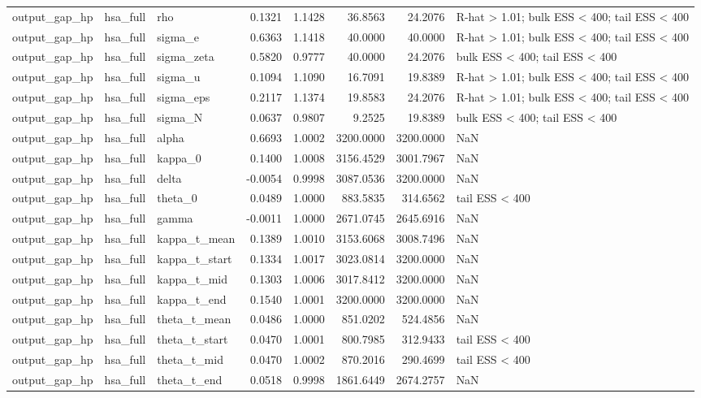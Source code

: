 \begin{tabular}{lllrrrrl}
output\_gap\_hp & hsa\_full & rho & 0.1321 & 1.1428 & 36.8563 & 24.2076 & R-hat > 1.01; bulk ESS < 400; tail ESS < 400 \\
output\_gap\_hp & hsa\_full & sigma\_e & 0.6363 & 1.1418 & 40.0000 & 40.0000 & R-hat > 1.01; bulk ESS < 400; tail ESS < 400 \\
output\_gap\_hp & hsa\_full & sigma\_zeta & 0.5820 & 0.9777 & 40.0000 & 24.2076 & bulk ESS < 400; tail ESS < 400 \\
output\_gap\_hp & hsa\_full & sigma\_u & 0.1094 & 1.1090 & 16.7091 & 19.8389 & R-hat > 1.01; bulk ESS < 400; tail ESS < 400 \\
output\_gap\_hp & hsa\_full & sigma\_eps & 0.2117 & 1.1374 & 19.8583 & 24.2076 & R-hat > 1.01; bulk ESS < 400; tail ESS < 400 \\
output\_gap\_hp & hsa\_full & sigma\_N & 0.0637 & 0.9807 & 9.2525 & 19.8389 & bulk ESS < 400; tail ESS < 400 \\
output\_gap\_hp & hsa\_full & alpha & 0.6693 & 1.0002 & 3200.0000 & 3200.0000 & NaN \\
output\_gap\_hp & hsa\_full & kappa\_0 & 0.1400 & 1.0008 & 3156.4529 & 3001.7967 & NaN \\
output\_gap\_hp & hsa\_full & delta & -0.0054 & 0.9998 & 3087.0536 & 3200.0000 & NaN \\
output\_gap\_hp & hsa\_full & theta\_0 & 0.0489 & 1.0000 & 883.5835 & 314.6562 & tail ESS < 400 \\
output\_gap\_hp & hsa\_full & gamma & -0.0011 & 1.0000 & 2671.0745 & 2645.6916 & NaN \\
output\_gap\_hp & hsa\_full & kappa\_t\_mean & 0.1389 & 1.0010 & 3153.6068 & 3008.7496 & NaN \\
output\_gap\_hp & hsa\_full & kappa\_t\_start & 0.1334 & 1.0017 & 3023.0814 & 3200.0000 & NaN \\
output\_gap\_hp & hsa\_full & kappa\_t\_mid & 0.1303 & 1.0006 & 3017.8412 & 3200.0000 & NaN \\
output\_gap\_hp & hsa\_full & kappa\_t\_end & 0.1540 & 1.0001 & 3200.0000 & 3200.0000 & NaN \\
output\_gap\_hp & hsa\_full & theta\_t\_mean & 0.0486 & 1.0000 & 851.0202 & 524.4856 & NaN \\
output\_gap\_hp & hsa\_full & theta\_t\_start & 0.0470 & 1.0001 & 800.7985 & 312.9433 & tail ESS < 400 \\
output\_gap\_hp & hsa\_full & theta\_t\_mid & 0.0470 & 1.0002 & 870.2016 & 290.4699 & tail ESS < 400 \\
output\_gap\_hp & hsa\_full & theta\_t\_end & 0.0518 & 0.9998 & 1861.6449 & 2674.2757 & NaN \\

\end{tabular}
